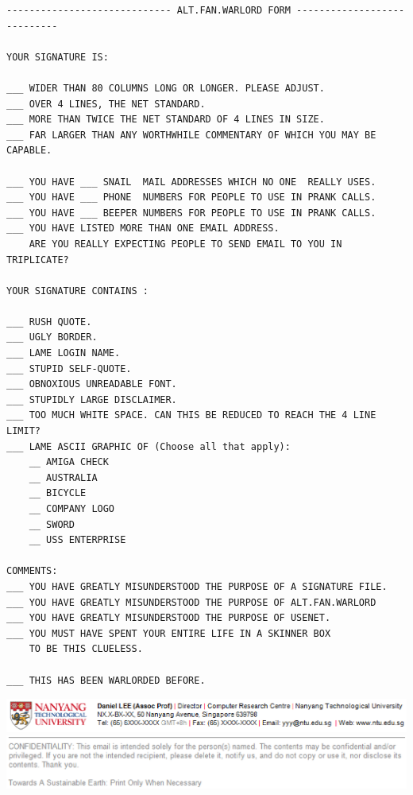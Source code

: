 \documentclass[a4paper,landscape,headrule,footrule,xetex]{foils}
\begin{document}
\hspace*{-5mm}\begin{small}
\begin{verbatim}
----------------------------- ALT.FAN.WARLORD FORM ----------------------------

YOUR SIGNATURE IS:

___ WIDER THAN 80 COLUMNS LONG OR LONGER. PLEASE ADJUST.
___ OVER 4 LINES, THE NET STANDARD.
___ MORE THAN TWICE THE NET STANDARD OF 4 LINES IN SIZE.
___ FAR LARGER THAN ANY WORTHWHILE COMMENTARY OF WHICH YOU MAY BE CAPABLE.

___ YOU HAVE ___ SNAIL  MAIL ADDRESSES WHICH NO ONE  REALLY USES.
___ YOU HAVE ___ PHONE  NUMBERS FOR PEOPLE TO USE IN PRANK CALLS.
___ YOU HAVE ___ BEEPER NUMBERS FOR PEOPLE TO USE IN PRANK CALLS.
___ YOU HAVE LISTED MORE THAN ONE EMAIL ADDRESS.
    ARE YOU REALLY EXPECTING PEOPLE TO SEND EMAIL TO YOU IN TRIPLICATE?

YOUR SIGNATURE CONTAINS :

___ RUSH QUOTE.
___ UGLY BORDER.
___ LAME LOGIN NAME.
___ STUPID SELF-QUOTE.
___ OBNOXIOUS UNREADABLE FONT.
___ STUPIDLY LARGE DISCLAIMER.
___ TOO MUCH WHITE SPACE. CAN THIS BE REDUCED TO REACH THE 4 LINE LIMIT?
___ LAME ASCII GRAPHIC OF (Choose all that apply):
    __ AMIGA CHECK
    __ AUSTRALIA
    __ BICYCLE
    __ COMPANY LOGO
    __ SWORD
    __ USS ENTERPRISE

COMMENTS:
___ YOU HAVE GREATLY MISUNDERSTOOD THE PURPOSE OF A SIGNATURE FILE.
___ YOU HAVE GREATLY MISUNDERSTOOD THE PURPOSE OF ALT.FAN.WARLORD
___ YOU HAVE GREATLY MISUNDERSTOOD THE PURPOSE OF USENET.
___ YOU MUST HAVE SPENT YOUR ENTIRE LIFE IN A SKINNER BOX 
    TO BE THIS CLUELESS.

___ THIS HAS BEEN WARLORDED BEFORE.
\end{verbatim}
\end{small}


\begin{center}
  \includegraphics[width=\textwidth]{../pics/sig_ntu}
  \includegraphics[width=\textwidth]{../pics/disclaimer}
\end{center}
\end{document}
